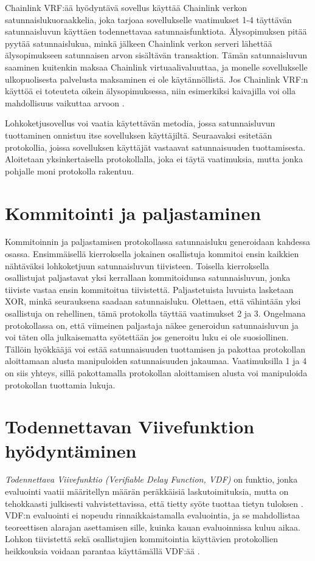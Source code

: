 Chainlink VRF:ää hyödyntävä sovellus käyttää Chainlink verkon satunnaislukuoraakkelia, joka tarjoaa sovellukselle vaatimukset 1-4 täyttävän satunnaisluvun käyttäen todennettavaa satunnaisfunktiota. Älysopimuksen pitää pyytää satunnaislukua, minkä jälkeen Chainlink verkon serveri lähettää älysopimukseen satunnaisen arvon sisältävän transaktion. Tämän satunnaisluvun saaminen kuitenkin maksaa Chainlink virtuaalivaluuttaa, ja monelle sovellukselle ulkopuolisesta palvelusta maksaminen ei ole käytännöllistä. Jos Chainlink VRF:n käyttöä ei toteuteta oikein älysopimuksessa, niin esimerkiksi kaivajilla voi olla mahdollisuus vaikuttaa arvoon \cite{noauthor_vrf_nodate}.

Lohkoketjusovellus voi vaatia käytettävän metodia, jossa satunnaisluvun tuottaminen onnistuu itse sovelluksen käyttäjiltä. Seuraavaksi esitetään protokollia, joissa sovelluksen käyttäjät vastaavat satunnaisuuden tuottamisesta. Aloitetaan yksinkertaisella protokollalla, joka ei täytä vaatimuksia, mutta jonka pohjalle moni protokolla rakentuu.

\section{Kommitointi ja paljastaminen} %
Kommitoinnin ja paljastamisen protokollassa satunnaisluku generoidaan kahdessa osassa. Ensimmäisellä kierroksella jokainen osallistuja kommitoi ensin kaikkien nähtäväksi lohkoketjuun satunnaisluvun tiivisteen. Toisella kierroksella osallistujat paljastavat yksi kerrallaan kommitoidunsa satunnaisluvun, jonka tiiviste vastaa ensin kommitoitua tiivistettä. Paljastetuista luvuista lasketaan XOR, minkä seurauksena saadaan satunnaisluku. Olettaen, että vähintään yksi osallistuja on rehellinen, tämä protokolla täyttää vaatimukset 2 ja 3. Ongelmana protokollassa on, että viimeinen paljastaja näkee generoidun satunnaisluvun ja voi täten olla julkaisematta syötettään jos generoitu luku ei ole suosiollinen. Tällöin hyökkääjä voi estää satunnaisuuden tuottamisen ja pakottaa protokollan aloittamaan alusta manipuloiden satunnaisuuden jakaumaa. Vaatimuksilla 1 ja 4 on siis yhteys, sillä pakottamalla protokollan aloittamisen alusta voi manipuloida protokollan tuottamia lukuja.

\section{Todennettavan Viivefunktion hyödyntäminen}
\textit{Todennettava Viivefunktio  (Verifiable Delay Function, VDF)} on funktio, jonka evaluointi vaatii määritellyn määrän peräkkäisiä laskutoimituksia, mutta on tehokkaasti julkisesti vahvistettavissa, että tietty syöte tuottaa tietyn tuloksen \cite{boneh_verifiable_2018}. VDF:n evaluointi ei nopeudu rinnaikkaistamalla evaluointia, ja se mahdollistaa teoreettisen alarajan asettamisen sille, kuinka kauan evaluoinnissa kuluu aikaa. Lohkon tiivistettä sekä osallistujien kommitointia käyttävien protokollien heikkouksia voidaan parantaa käyttämällä VDF:ää \cite{boneh_verifiable_2018}. 

